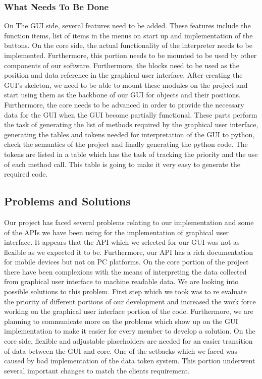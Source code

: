 \documentclass[journal,10pt,onecolumn,compsoc]{IEEEtran} \usepackage[margin=1.0in]{geometry} \usepackage{pdfpages}
\begin{document}
\subsubsection{What Needs To Be Done}
On The GUI side, several features need to be added. These features include the function items, list of items in the menus on start up and implementation of the buttons. On the core side, the actual functionality of the interpreter needs to be implemented. Furthermore, this portion needs to be mounted to be used by other components of our software. Furthermore, the blocks need to be used as the position and data reference in the graphical user interface. After creating the GUI’s skeleton, we need to be able to mount these modules on the project and start using them as the backbone of our GUI for objects and  their positions. Furthermore, the core needs to be advanced in order to provide the necessary data for the GUI when the GUI become partially functional. These parts perform the task of generating the list of methods required by the graphical user interface, generating the tables and tokens needed for interpretation of the GUI to python, check the semantics of the project and finally generating the python code. The tokens are listed in a table which has the task of tracking the priority and the use of each method call. This table is going to make it very easy to generate the required code.
\subsection{Problems and Solutions}
Our project has faced several problems relating to our implementation and some of the APIs we have been using for the implementation of graphical user interface. It appears that the API which we selected for our GUI was not as flexible as we expected it to be. Furthermore, our API has a rich documentation for mobile devices but not on PC platforms. On the core portion of the project there have been complexions with the means of interpreting the data collected from graphical user interface to machine readable data. We are looking into possible solutions  to this problem. First step which we took was to re evaluate the priority of different portions of our development and increased the work force working on the graphical user interface portion of the code. Furthermore, we are planning to communicate more on the problems which show up on the GUI implementation to make it easier for every member to develop a solution. On the core side, flexible and adjustable placeholders are needed for an easier transition of data between the GUI and core. One of the setbacks which we faced was caused by bad implementation of the data token system. This portion underwent several important changes to match the clients requirement.
\end{document}
